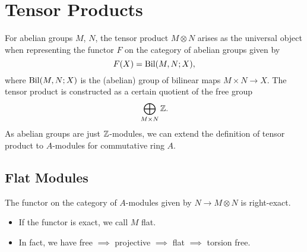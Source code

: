 \section{Tensor Products}
For abelian groups $M$, $N$, the tensor product $M \otimes N$ arises as the universal object when representing the functor $F$ on the category of abelian groups given by
\[
    F(X) = \operatorname{Bil}(M, N; X),
\]
where $\operatorname{Bil}(M, N; X)$ is the (abelian) group of bilinear maps $M \times N \rightarrow X$. The tensor product is constructed as a certain quotient of the free group
\[
    \bigoplus_{M \times N} {\mathbb Z}.
\]
As abelian groups are just ${\mathbb Z}$-modules, we can extend the definition of tensor product to $A$-modules for commutative ring $A$.

\subsection{Flat Modules}
The functor on the category of $A$-modules given by $N \rightarrow M \otimes N$ is right-exact.
\begin{itemize}
    \item If the functor is exact, we call $M$ flat.
    \item In fact, we have free $\implies$ projective $\implies$ flat $\implies$ torsion free.
\end{itemize}
